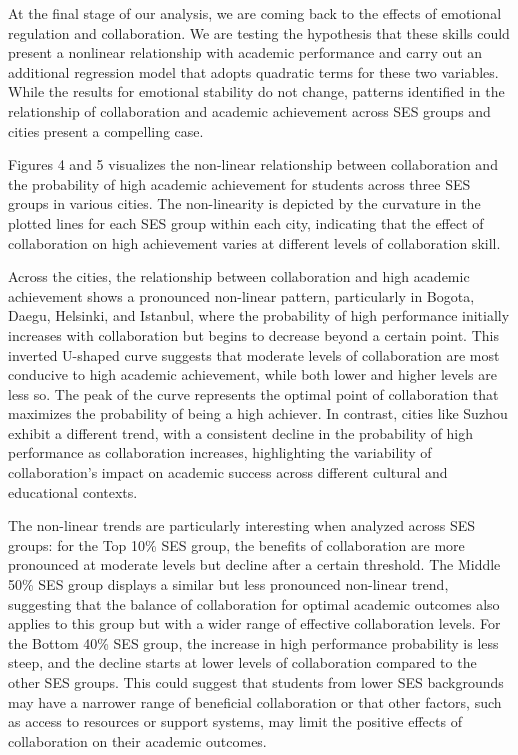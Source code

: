 \documentclass{article}
\begin{document}
At the final stage of our analysis, we are coming back to the effects of
emotional regulation and collaboration. We are testing the hypothesis
that these skills could present a nonlinear relationship with academic
performance and carry out an additional regression model that adopts
quadratic terms for these two variables. While the results for emotional
stability do not change, patterns identified in the relationship of
collaboration and academic achievement across SES groups and cities
present a compelling case.

Figures 4 and 5 visualizes the non-linear relationship between
collaboration and the probability of high academic achievement for
students across three SES groups in various cities. The non-linearity is
depicted by the curvature in the plotted lines for each SES group within
each city, indicating that the effect of collaboration on high
achievement varies at different levels of collaboration skill.

Across the cities, the relationship between collaboration and high
academic achievement shows a pronounced non-linear pattern, particularly
in Bogota, Daegu, Helsinki, and Istanbul, where the probability of high
performance initially increases with collaboration but begins to
decrease beyond a certain point. This inverted U-shaped curve suggests
that moderate levels of collaboration are most conducive to high
academic achievement, while both lower and higher levels are less so.
The peak of the curve represents the optimal point of collaboration that
maximizes the probability of being a high achiever. In contrast, cities
like Suzhou exhibit a different trend, with a consistent decline in the
probability of high performance as collaboration increases, highlighting
the variability of collaboration's impact on academic success across
different cultural and educational contexts.

The non-linear trends are particularly interesting when analyzed across
SES groups: for the Top 10\% SES group, the benefits of collaboration
are more pronounced at moderate levels but decline after a certain
threshold. The Middle 50\% SES group displays a similar but less
pronounced non-linear trend, suggesting that the balance of
collaboration for optimal academic outcomes also applies to this group
but with a wider range of effective collaboration levels. For the Bottom
40\% SES group, the increase in high performance probability is less
steep, and the decline starts at lower levels of collaboration compared
to the other SES groups. This could suggest that students from lower SES
backgrounds may have a narrower range of beneficial collaboration or
that other factors, such as access to resources or support systems, may
limit the positive effects of collaboration on their academic outcomes.
\end{document}
